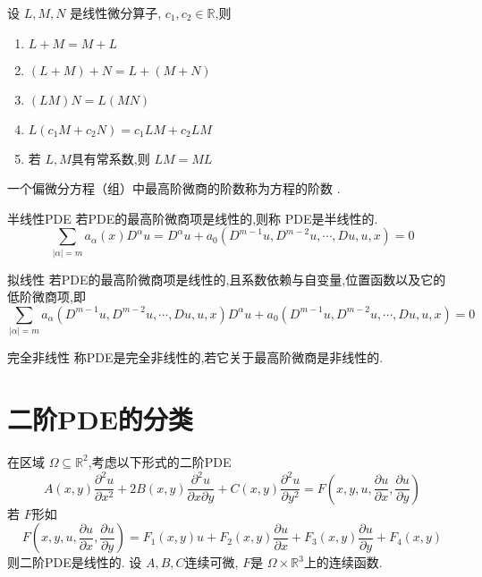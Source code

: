 \documentclass[../../PDE.tex]{subfiles}
\begin{document}
\begin{proposition}
    设 \(  L,M,N  \) 是线性微分算子, \(  c_1,c_2\in \mathbb{R}   \),则 
    \begin{enumerate}
        \item \(  L+ M= M+ L  \) 
        \item \(  \left( L+ M \right)+ N   = L+ \left( M+ N \right) \)
        \item \(  \left( LM \right)N = L\left( MN \right) \)
        \item \(  L\left( c_1M+ c_2N \right)= c_1LM+ c_2LM   \)
        \item 若 \(  L,M  \)具有常系数,则 \(  LM= ML  \)     
    \end{enumerate}
     
\end{proposition}


\begin{definition}
    一个偏微分方程（组）中最高阶微商的阶数称为方程的阶数    .
\end{definition}

\begin{definition}{半线性PDE}
    若PDE的最高阶微商项是线性的,则称 PDE是半线性的. \[
    \sum _{\left|  \alpha  \right|= m } a_{\alpha }\left( x \right)D^{ \alpha }u= D^{\alpha }u + a_0\left( D^{m-1}u,D^{m-2}u,\cdots ,Du,u,x \right)= 0  
    \]
\end{definition}

\begin{definition}{拟线性}
    若PDE的最高阶微商项是线性的,且系数依赖与自变量,位置函数以及它的低阶微商项,即 \[
    \sum _{\left| \alpha  \right|= m } a_{\alpha }\left( D^{m-1}u,D^{m-2}u,\cdots ,Du,u,x \right)D^{ \alpha }u+ a_0\left( D^{m-1}u,D^{m-2}u,\cdots ,Du,u,x \right)  = 0
    \]
\end{definition}

\begin{definition}{完全非线性}
    称PDE是完全非线性的,若它关于最高阶微商是非线性的.
\end{definition}

\section{二阶PDE的分类}

在区域 \(   \Omega \subseteq \mathbb{R} ^{2}  \),考虑以下形式的二阶PDE 
\begin{equation}\label{3.30-1}
  A\left( x,y \right) \frac{\partial ^{2}u}{\partial x^{2}}+ 2B\left( x,y \right)\frac{\partial ^{2}u}{\partial x \partial y}+ C\left( x,y \right)  \frac{\partial ^{2}u}{\partial y^{2}}= F\left( x,y,u,\frac{\partial u}{\partial x},\frac{\partial u}{\partial y} \right) 
\end{equation} 
若 \(  F  \)形如 \[
F\left( x,y,u,\frac{\partial u}{\partial x},\frac{\partial u}{\partial y} \right)= F_1\left( x,y \right)u+ F_2\left( x,y \right)\frac{\partial u}{\partial x}+ F_3\left( x,y \right)\frac{\partial u}{\partial y}+ F_4\left( x,y \right)     
\]则二阶PDE是线性的.
设 \(  A,B,C  \)连续可微, \(  F  \)是 \(   \Omega \times \mathbb{R} ^{3}  \)上的连续函数. 
\end{document}
